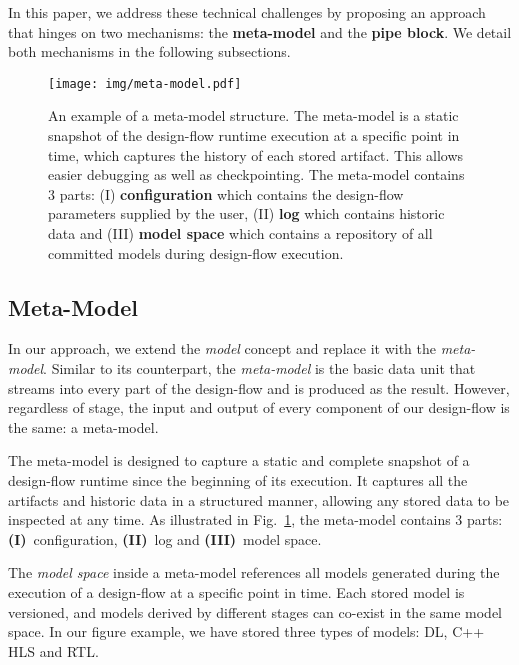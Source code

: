 In this paper, we address these technical challenges by proposing an approach that hinges on two mechanisms: the \textbf{meta-model} and the \textbf{pipe block}. We detail both mechanisms in the following subsections.

\begin{figure}[tp]
   \centering
    \texttt{[image: img/meta-model.pdf]} 
  \caption{An example of a meta-model structure. The meta-model is a static snapshot of the design-flow runtime execution at a specific point in time, which captures the history of each stored artifact. This allows easier debugging as well as checkpointing. The meta-model contains 3 parts: (I) \textbf{configuration} which contains the design-flow parameters supplied by the user, (II) \textbf{log} which contains historic data and (III) \textbf{model space} which contains a repository of all committed models during design-flow execution.}
  \label{fig:meta-model} 
\end{figure}

\subsection{Meta-Model}

In our approach, we extend the \textit{model} concept and replace it with the \textit{meta-model}. Similar to its counterpart, the \textit{meta-model} is the basic data unit that streams into every part of the design-flow and is produced as the result. However, regardless of stage, the input and output of every component of our design-flow is the same: a meta-model.

The meta-model is designed to capture a static and complete snapshot of a design-flow runtime since the beginning of its execution. It captures all the artifacts and historic data in a structured manner, allowing any stored data to be inspected at any time. As illustrated in Fig.~\ref{fig:meta-model}, the meta-model contains 3 parts:    \textbf{(I)}~configuration, \textbf{(II)}~log and \textbf{(III)}~model space. 

The \textit{model space} inside a meta-model references all models generated during the execution of a design-flow at a specific point in time. Each stored model is versioned, and models derived by different stages can co-exist in the same model space. In our figure example, we have stored three types of models: DL, C++ HLS and RTL.

